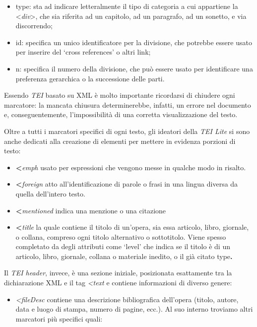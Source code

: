 {\begin{itemize}
\item
  type: sta ad indicare letteralmente il tipo di categoria a cui
  appartiene la \textless{}\emph{div}\textgreater{}, che sia riferita ad
  un capitolo, ad un paragrafo, ad un sonetto, e via discorrendo;
\item
  id: specifica un unico identificatore per la divisione, che potrebbe
  essere usato per inserire del `cross references' o altri link;
\item
  n: specifica il numero della divisione, che può essere usato per
  identificare una preferenza gerarchica o la successione delle parti.
\end{itemize}

Essendo \emph{TEI} basato su XML è molto importante ricordarsi di
chiudere ogni marcatore: la mancata chiusura determinerebbe, infatti, un
errore nel documento e, conseguentemente, l'impossibilità di una
corretta visualizzazione del testo.

Oltre a tutti i marcatori specifici di ogni testo, gli ideatori della
\emph{TEI Lite} si sono anche dedicati alla creazione di elementi per
mettere in evidenza porzioni di testo:

\begin{itemize}
\item
  \textbf{\textless{}}\emph{emph}\textbf{} usato per
  espressioni che vengono messe in qualche modo in risalto.
\item
  \textbf{\textless{}}\emph{foreign}\textbf{} atto
  all'identificazione di parole o frasi in una lingua diversa da quella
  dell'intero testo.
\item
  \textbf{\textless{}}\emph{mentioned}\textbf{} indica una
  menzione o una citazione
\item
  \textbf{\textless{}}\emph{title}\textbf{} la quale
  contiene il titolo di un'opera, sia essa articolo, libro, giornale, o
  collana, compreso ogni titolo alternativo o sottotitolo. Viene spesso
  completato da degli attributi come `level' che indica se il titolo è
  di un articolo, libro, giornale, collana o materiale inedito, o il già
  citato type\textbf{.}
\end{itemize}

Il \emph{TEI header}, invece, è una sezione iniziale, posizionata
esattamente tra la dichiarazione XML e il tag
\emph{\textless{}text} e contiene informazioni di diverso
genere:

\begin{itemize}
\item
  \emph{\textless{}fileDesc} contiene una descrizione
  bibliografica dell'opera (titolo, autore, data e luogo di stampa,
  numero di pagine, ecc.). Al suo interno troviamo altri marcatori più
  specifici quali:
\end{itemize}

}
